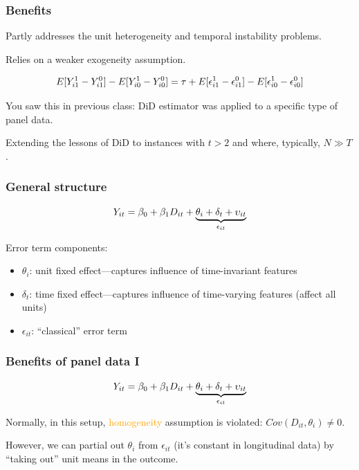 \documentclass[11pt,english,dvipsnames,aspectratio=169,handout]{beamer}\usepackage[]{graphicx}\usepackage[]{xcolor}
\begin{document}
\begin{frame}
	\frametitle{Benefits}
	Partly addresses the unit heterogeneity and temporal instability problems.\bigskip
	
	Relies on a weaker exogeneity assumption.\pause
	
	\begin{equation}
	  \footnotesize
	  E[Y_{i1}^1 - Y_{i1}^0] - E[Y_{i0}^1 - Y_{i0}^0] = \tau + E[\epsilon_{i1}^1 - \epsilon_{i1}^0] - E[\epsilon_{i0}^1 - \epsilon_{i0}^0]
	\end{equation}
	
	You saw this in previous class: DiD estimator was applied to a specific type of panel data.\bigskip
	\pause
	
	Extending the lessons of DiD to instances with $t>2$ and where, typically, $N \gg T$.
	
\end{frame}


\begin{frame}
	\frametitle{General structure}
	
	\begin{equation}
	  \centering
	  Y_{it} = \beta_0 + \beta_1D_{it} + \underbrace{\theta_i + \delta_t + \upsilon_{it}}_{\epsilon_{it}}
	\end{equation}\bigskip
	\pause
	
	Error term components:
	
	\begin{itemize}
	\item $\theta_i$: unit fixed effect---captures influence of time-invariant features\pause
	\item $\delta_t$: time fixed effect---captures influence of time-varying features (affect all units)\pause
	\item $\epsilon_{it}$: ``classical'' error term
	\end{itemize}
	
\end{frame}


\begin{frame}
	\frametitle{Benefits of panel data I}
	
	\begin{equation}
	  \centering
	  Y_{it} = \beta_0 + \beta_1D_{it} + \underbrace{\theta_i + \delta_t + \upsilon_{it}}_{\epsilon_{it}}
	\end{equation}
	
	Normally, in this setup, \textcolor{orange}{homogeneity} assumption is violated: $Cov(D_{it}, \theta_i) \neq 0$.\bigskip
	\pause
	
	However, we can partial out $\theta_i$ from $\epsilon_{it}$ (it's constant in longitudinal data) by ``taking out'' unit means in the outcome.

\end{frame}
\end{document}

